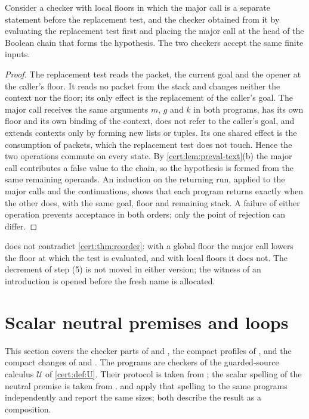 \begin{theorem}\label{cert:thm:reorder}
Consider a checker with local floors in which the major call is a separate
statement before the replacement test, and the checker obtained from it by
evaluating the replacement test first and placing the major call at the head
of the Boolean chain that forms the hypothesis. The two checkers accept the
same finite inputs.
\end{theorem}
\begin{proof}
The replacement test reads the packet, the current goal and the opener at the
caller's floor. It reads no packet from the stack and changes neither the
context nor the floor; its only effect is the replacement of the caller's
goal. The major call receives the same arguments $m$, $g$ and $k$ in both
programs, has its own floor and its own binding of the context, does not
refer to the caller's goal, and extends contexts only by forming new lists or
tuples. Its one shared effect is the consumption of packets, which the
replacement test does not touch. Hence the two operations commute on every
state. By \cref{cert:lem:preval-text}(b) the major call contributes a
false value to the chain, so the hypothesis is formed from the same remaining
operands. An induction on the returning run, applied to the major calls and
the continuations, shows that each program returns exactly when the other
does, with the same goal, floor and remaining stack. A failure of either
operation prevents acceptance in both orders; only the point of rejection can
differ.
\end{proof}

 does not contradict \cref{cert:thm:reorder}: with
a global floor the major call lowers the floor at which the test is evaluated,
and with local floors it does not. The decrement of step (5) is not moved in
either version; the witness of an introduction is opened before the fresh
name is allocated.

\section{Scalar neutral premises and loops}\label{cert:sec:scalar}

This section covers the checker parts of  and
, the compact profiles of , and the
compact changes of  and
. The programs are checkers of the
guarded-source calculus $\mathcal U$ of \cref{cert:def:U}. Their protocol is
taken from ; the scalar spelling of the neutral premise
is taken from .  and
 apply that spelling to the same programs independently
and report the same sizes; both describe the result as a composition.

